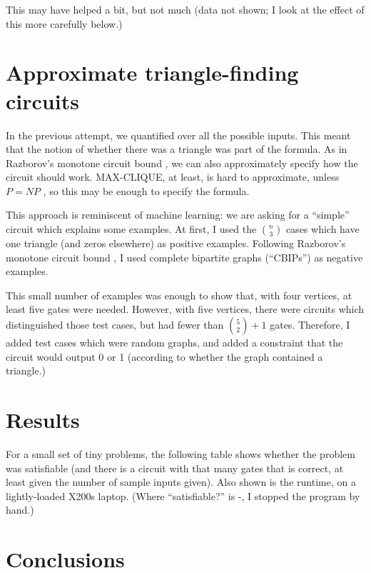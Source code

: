 \documentclass[12pt]{article}
\begin{document}
This may have helped a bit, but not much (data not shown; I
look at the effect of this more carefully below.)

\section{Approximate triangle-finding circuits}

In the previous attempt, we quantified over all the possible inputs. This meant that the notion of
whether there was a triangle was part of the formula. As in Razborov's monotone circuit bound \cite{Razborov85lowerbounds}, we
can also approximately specify how the circuit should work.
MAX-CLIQUE, at least, is
hard to approximate, unless $P=NP$ \cite{hastad_clique_1999}, so this
may be enough to specify the formula.

This approach is reminiscent of machine learning: we are asking for a ``simple'' circuit which explains some examples. At first,
I used the $n \choose 3$ cases which have one triangle (and zeros elsewhere) as
positive examples. Following Razborov's monotone circuit bound \cite{Razborov85lowerbounds}, 
I used complete bipartite graphs (``CBIPs'') as negative examples.

This small number of examples was enough to show that, with four vertices,
at least five gates were needed. However, with five vertices, there were
circuits which distinguished those test cases, but had fewer than ${5 \choose 2} + 1$ gates. Therefore, I added test cases which were random graphs,
and added a constraint that the circuit would output 0 or 1 (according
to whether the graph contained a triangle.)

\section{Results}

For a small set of tiny problems, the following table shows whether the problem was satisfiable
(and there is a circuit with that many gates that is correct, at least given the number of
sample inputs given). Also shown is the runtime, on a
lightly-loaded X200s laptop. (Where ``satisfiable?'' is -, I stopped the program by hand.)


\section{Conclusions}
\end{document}
